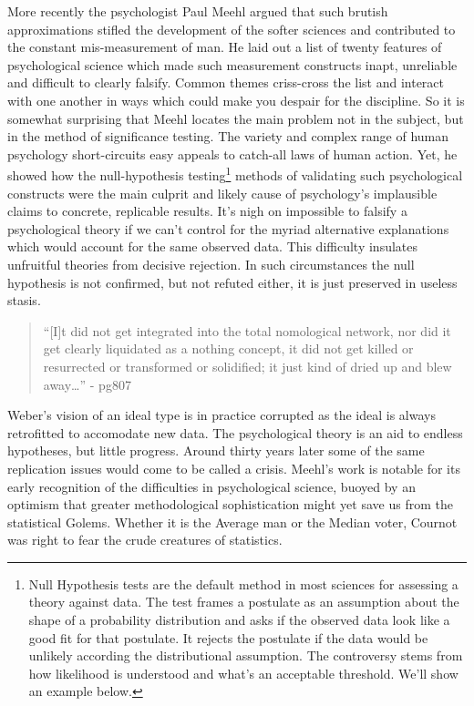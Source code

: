 \documentclass[]{tufte-book}
\theoremstyle{definition}
\theoremstyle{definition}
\theoremstyle{definition}
\theoremstyle{remark}
\begin{document}
More recently the psychologist Paul Meehl argued that such brutish approximations stifled the development of the softer sciences and contributed to the constant mis-measurement of man. He laid out a list of twenty features of psychological science which made such measurement constructs inapt, unreliable and difficult to clearly falsify. Common themes criss-cross the list and interact with one another in ways which could make you despair for the discipline. So it is somewhat surprising that Meehl locates the main problem not in the subject, but in the method of significance testing. The variety and complex range of human psychology short-circuits easy appeals to catch-all laws of human action. \citep{MeehlTheoretical} Yet, he showed how the null-hypothesis testing\footnote{Null Hypothesis tests are the default method in most sciences for assessing a theory against data. The test frames a postulate as an assumption about the shape of a probability distribution and asks if the observed data look like a good fit for that postulate. It rejects the postulate if the data would be unlikely according the distributional assumption. The controversy stems from how likelihood is understood and what's an acceptable threshold. We'll show an example below.} methods of validating such psychological constructs were the main culprit and likely cause of psychology's implausible claims to concrete, replicable results. It's nigh on impossible to falsify a psychological theory if we can't control for the myriad alternative explanations which would account for the same observed data. This difficulty insulates unfruitful theories from decisive rejection. In such circumstances the null hypothesis is not confirmed, but not refuted either, it is just preserved in useless stasis.

\begin{quote}
``{[}I{]}t did not get integrated into the total nomological network, nor did it get clearly liquidated as a nothing concept, it did not get killed or resurrected or transformed or solidified; it just kind of dried up and blew away\ldots{}'' - \citep{MeehlTheoretical} pg807
\end{quote}

Weber's vision of an ideal type is in practice corrupted as the ideal is always retrofitted to accomodate new data. The psychological theory is an aid to endless hypotheses, but little progress. Around thirty years later some of the same replication issues would come to be called a crisis. Meehl's work is notable for its early recognition of the difficulties in psychological science, buoyed by an optimism that greater methodological sophistication might yet save us from the statistical Golems. Whether it is the Average man or the Median voter, Cournot was right to fear the crude creatures of statistics.
\end{document}
